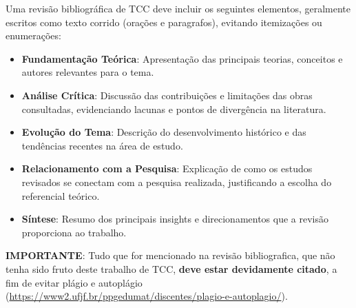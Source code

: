 


Uma revisão bibliográfica de TCC deve incluir os seguintes elementos, geralmente escritos como texto corrido (orações e paragrafos), evitando itemizações ou enumerações:

\begin{itemize}
    \item \textbf{Fundamentação Teórica}: Apresentação das principais teorias, conceitos e autores relevantes para o tema.
    \item \textbf{Análise Crítica}: Discussão das contribuições e limitações das obras consultadas, evidenciando lacunas e pontos de divergência na literatura.
    \item \textbf{Evolução do Tema}: Descrição do desenvolvimento histórico e das tendências recentes na área de estudo.
    \item \textbf{Relacionamento com a Pesquisa}: Explicação de como os estudos revisados se conectam com a pesquisa realizada, justificando a escolha do referencial teórico.
    \item \textbf{Síntese}: Resumo dos principais insights e direcionamentos que a revisão proporciona ao trabalho.
\end{itemize}

\textbf{IMPORTANTE}: Tudo que for mencionado na revisão bibliografica, que não tenha sido fruto deste trabalho de TCC, \textbf{deve estar devidamente citado}, a fim de evitar plágio e autoplágio (\url{https://www2.ufjf.br/ppgedumat/discentes/plagio-e-autoplagio/}).
